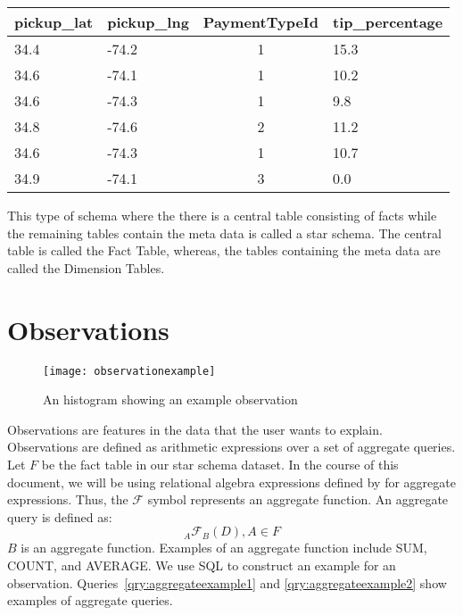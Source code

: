 
\begin{center}
  \begin{tabular}{ | l | l | c | l | }
    \hline
    \textbf{pickup\_lat} & \textbf{pickup\_lng} & \textbf{PaymentTypeId} & \textbf{tip\_percentage} \\ \hline
    34.4 & -74.2 & 1 & 15.3 \\ \hline
    34.6 & -74.1 & 1 & 10.2 \\ \hline
    34.6 & -74.3 & 1 & 9.8 \\ \hline
    34.8 & -74.6 & 2 & 11.2 \\ \hline
    34.6 & -74.3 & 1 & 10.7 \\ \hline
    34.9 & -74.1 & 3 & 0.0 \\
    \hline
  \end{tabular}
\end{center}
\label{tbl:fact}

This type of schema where the there is a central table consisting of facts while the remaining tables contain the meta data is called a star schema. The central table is called the Fact Table, whereas, the tables containing the meta data are called the Dimension Tables.

\section{Observations}
\begin{figure}[ht]
  \begin{center}
  \texttt{[image: observationexample]}
  \end{center}

  \caption{An histogram showing an example observation}
  \label{fig:observation_example}
\end{figure}
Observations are features in the data that the user wants to explain. Observations are defined as arithmetic expressions over a set of aggregate queries. Let $F$ be the fact table in our star schema dataset. In the course of this document, we will be using relational algebra expressions defined by \cite{elmasri2011fundamentals} for aggregate expressions. Thus, the $\mathscr{F}$ symbol represents an aggregate function. An aggregate query is defined as:
$$_A\mathscr{F}_B(D), A \in F$$
$B$ is an aggregate function. Examples of an aggregate function include SUM, COUNT, and AVERAGE.
We use SQL to construct an example for an observation. Queries~\ref{qry:aggregateexample1} and \ref{qry:aggregateexample2} show examples of aggregate queries.

